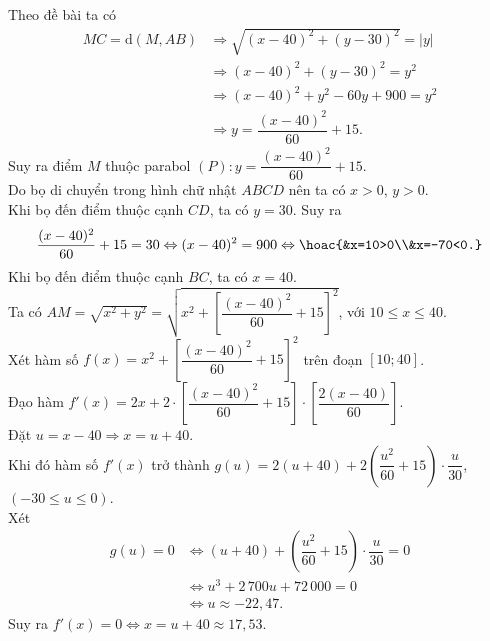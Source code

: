 \begin{ex}
{{
		}
		\noindent
		Theo đề bài ta có
		\allowdisplaybreaks
		\begin{align*}
			MC= \mathrm{d}(M,AB)
			&\Rightarrow \sqrt{(x-40)^2 + (y-30)^2} = |y|\\
			&\Rightarrow (x-40)^2 + (y-30)^2 = y^2\\
			&\Rightarrow (x-40)^2 + y^2-60y + 900 = y^2\\
			&\Rightarrow y=\dfrac{(x-40)^2}{60}+15.
		\end{align*}
		Suy ra điểm $M$ thuộc parabol $(P)\colon y=\dfrac{(x-40)^2}{60}+15$.\\
		Do bọ di chuyển trong hình chữ nhật $ABCD$ nên ta có $x>0$, $y>0$. \\
		Khi bọ đến điểm thuộc cạnh $CD$, ta có $y=30$. Suy ra
		\[\dfrac{(x-40)^2}{60}+15=30\Leftrightarrow (x-40)^2=900\Leftrightarrow \hoac{&x=10>0\\&x=-70<0.}\]
		Khi bọ đến điểm thuộc cạnh $BC$, ta có $x=40$.\\
		Ta có $AM=\sqrt{x^2+y^2}=\sqrt{x^2+\left[\dfrac{(x-40)^2}{60}+15\right]^2}$, với $10\le x\le 40$.\\
		Xét hàm số $f(x)=x^2+\left[\dfrac{(x-40)^2}{60}+15\right]^2$ trên đoạn $[10; 40]$.\\
		Đạo hàm $f'(x)=2x + 2 \cdot \left[ \dfrac{(x-40)^2}{60} + 15 \right] \cdot \left[ \dfrac{2(x-40)}{60} \right]$.\\
		Đặt $u=x-40\Rightarrow x=u+40$.\\
		Khi đó hàm số $f'(x)$ trở thành
		$g(u)=2(u + 40) + 2\left( \dfrac{u^2}{60} + 15 \right) \cdot \dfrac{u}{30}$, $(-30\le u\le 0)$. \\
		Xét
		\allowdisplaybreaks
		\begin{align*}
			g(u)=0
			&\Leftrightarrow
			(u + 40) + \left( \dfrac{u^2}{60} + 15 \right) \cdot \dfrac{u}{30} = 0\\
			&\Leftrightarrow
			u^3 + 2\,700u + 72\,000 = 0\\
			&\Leftrightarrow u\approx -22{,}47.
		\end{align*}
		Suy ra $f'(x)=0\Leftrightarrow x=u+40\approx 17{,}53$.\\
}
\end{ex}
